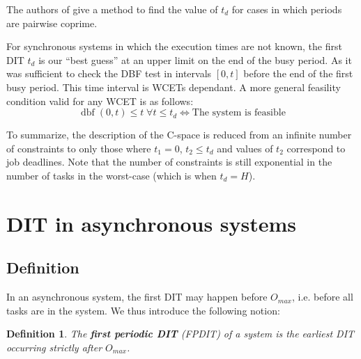 \documentclass[conference]{IEEEtran}
\newtheorem{definition}{Definition}
\newcommand{\dbf}[1]{\operatorname{dbf}(#1)}
\begin{document}
  The authors of \cite{george2009characterization} give a method to find the value of $t_d$ for cases in which periods are pairwise coprime.

  For synchronous systems in which the execution times are not known, the first DIT $t_d$
  is our ``best guess'' at an upper limit on the end of the busy period. As it was sufficient
  to check the DBF test in intervals $[0, t]$ before the end of the first busy period. This time interval is WCETs dependant. A more general feasility condition valid for any WCET is as follows:
  \begin{equation}
  		\dbf{0,t} \leqslant t \; \forall t \leqslant t_d
  		\iff \text{The system is feasible}
  \end{equation}

  To summarize, the description of the C-space is reduced from an infinite number
  of constraints to only those where $t_1 = 0$, $t_2 \leqslant t_d$ and
  values of $t_2$ correspond to job deadlines. Note that the number of
  constraints is still exponential in the number of tasks in the worst-case (which is when $t_d = H$).

\section{DIT in asynchronous systems}
  \label{sct:asyncDIT}

  \subsection{Definition}

    In an asynchronous system, the first DIT may happen before $O_{max}$, i.e. before all tasks are in the system. We thus introduce the following notion:

    \begin{definition}
      The \textbf{first periodic DIT} (FPDIT) of a system is the earliest DIT occurring
      strictly after $O_{max}$.
    \end{definition}
\end{document}
